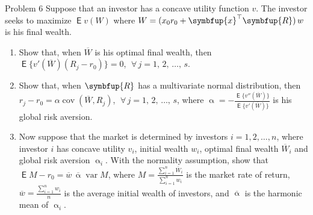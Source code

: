 \documentclass[10pt,handout]{beamer}
\newcommand{\ds}{\displaystyle}
\newcommand{\vx}{\symbfup{x}}
\newcommand{\vR}{\symbfup{R}}
\DeclareMathOperator\expc{\mathsf{E}}
\DeclareMathOperator\var{var}
\DeclareMathOperator\cov{cov}
\theoremstyle{definition}
\begin{document}
\begin{frame}{Problem 6}
  Suppose that an investor has a concave utility function $v$. The investor seeks to maximize $\expc v(W)$ where $\ds W = (x_0 r_0 + \vx^\top\vR)\,w$ is his final wealth.
  \begin{enumerate}
    \item Show that, when $\overline{W}$ is his optimal final wealth, then $\ds\expc\big\{v'(\overline{W})(R_j - r_0)\big\} = 0$, $\;\forall\,j = 1,\,2,\,\ldots,\,s$.
    \item Show that, when $\vR$ has a multivariate normal distribution, then $\ds r_j - r_0 = \alpha\cov(\overline{W}, R_j)$, $\;\forall\,j = 1,\,2,\,\ldots,\,s$, where $\ds\upalpha = -\frac{\expc\big\{v''(\overline{W})\big\}}{\expc\big\{v'(\overline{W})\big\}}$ is his global risk aversion.
    \item Now suppose that the market is determined by investors $i = 1, 2, \ldots, n$, where investor $i$ has concave utility $v_i$, initial wealth $w_i$, optimal final wealth $\overline{W}_i$ and global risk aversion $\upalpha_i$. With the normality assumption, show that $\ds\expc M - r_0 = \overline{w}\,\overline{\upalpha}\var M$, where $\ds M = \frac{\sum_{i=1}^n\overline{W}_i}{\sum_{i=1}^n w_i}$ is the market rate of return, $\ds\overline{w} = \frac{\sum_{i=1}^n w_i}{n}$ is the average initial wealth of investors, and $\overline{\upalpha}$ is the harmonic mean of $\upalpha_i$.
  \end{enumerate}
\end{frame}
\end{document}

